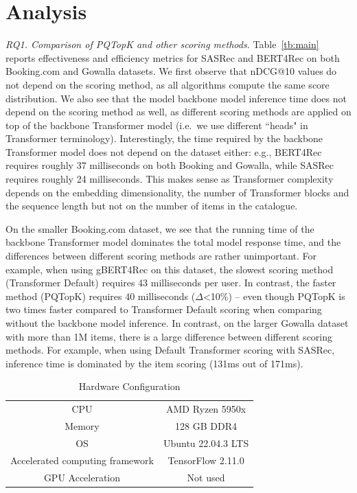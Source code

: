 \documentclass[sigconf,natbib=true, review=False]{acmart} %
\newcommand{\pageenlarge}[1]{\marginnote{#1}\enlargethispage{#1\baselineskip}}
\newcommand{\rsasha}[1]{\textcolor[HTML]{000000}{#1}}
\newcommand{\scrc}[1]{\textcolor[HTML]{000000}{#1}}
\begin{document}
\vspace{-0.5\baselineskip}
\section{Analysis}\label{sec:results}




 \textit{RQ1. Comparison of PQTopK and other scoring methods.} Table~\ref{tb:main} reports effectiveness and efficiency metrics for SASRec and BERT4\-Rec on both Booking.com and Gowalla datasets. We first observe that nDCG@10 values do not depend on the scoring method, as all algorithms compute the same score distribution. We also see that \rsasha{the model backbone model inference time} does not depend on the scoring method as well, as different scoring methods are applied on top of the backbone Transformer model (i.e.\ we use different ``heads" in Transformer terminology). Interestingly, the time required by the backbone Transformer model does not depend on the dataset either: e.g., BERT4Rec requires roughly 37 milliseconds on both Booking and Gowalla, while SASRec requires roughly 24 milliseconds. This makes sense as Transformer complexity depends on the embedding dimensionality, the number of Transformer blocks and the sequence length but not on the number of items in the catalogue.

On the smaller Booking.com dataset, we see that \scrc{the running time of the backbone Transformer model dominates the total model response time}, and the differences between different scoring methods are rather unimportant. For example, when using gBERT4Rec on this dataset, the slowest scoring method (Transformer Default) requires 43 milliseconds per user. In contrast, the faster method (PQTopK) requires 40 milliseconds ($\Delta$<10\%) -- \rsasha{even though PQTopK is two times faster compared to Transformer Default scoring when comparing without the backbone model inference.}  In contrast, on the larger Gowalla dataset with more than 1M items, there is a large difference between different scoring methods. For example, when using Default Transformer scoring with SASRec, inference time is dominated by the item scoring (131ms out of 171ms). 

\begin{table}[tb]
    \centering
    \caption{Hardware Configuration}
    \begin{tabular}{c|c}
        \toprule
         CPU & AMD Ryzen 5950x  \\
         Memory & 128 GB DDR4 \\ 
         OS & Ubuntu 22.04.3 LTS  \\
         Accelerated computing framework & TensorFlow 2.11.0 \\
         GPU Acceleration & Not used\\
         \bottomrule
    \end{tabular}
    \label{tb:hardware}
\end{table}
\end{document}
